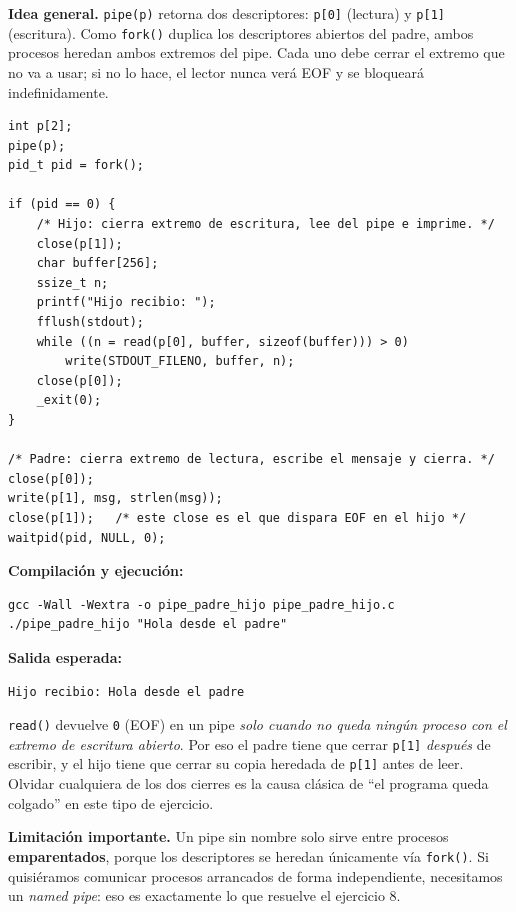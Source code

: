 \documentclass[11pt,a4paper]{article}
\begin{document}
\textbf{Idea general.} \texttt{pipe(p)} retorna dos descriptores:
\texttt{p[0]} (lectura) y \texttt{p[1]} (escritura). Como
\texttt{fork()} duplica los descriptores abiertos del padre, ambos
procesos heredan ambos extremos del pipe. Cada uno debe cerrar el
extremo que no va a usar; si no lo hace, el lector nunca verá EOF y
se bloqueará indefinidamente.

\begin{lstlisting}[style=cstyle]
int p[2];
pipe(p);
pid_t pid = fork();

if (pid == 0) {
    /* Hijo: cierra extremo de escritura, lee del pipe e imprime. */
    close(p[1]);
    char buffer[256];
    ssize_t n;
    printf("Hijo recibio: ");
    fflush(stdout);
    while ((n = read(p[0], buffer, sizeof(buffer))) > 0)
        write(STDOUT_FILENO, buffer, n);
    close(p[0]);
    _exit(0);
}

/* Padre: cierra extremo de lectura, escribe el mensaje y cierra. */
close(p[0]);
write(p[1], msg, strlen(msg));
close(p[1]);   /* este close es el que dispara EOF en el hijo */
waitpid(pid, NULL, 0);
\end{lstlisting}

\textbf{Compilación y ejecución:}

\begin{lstlisting}
gcc -Wall -Wextra -o pipe_padre_hijo pipe_padre_hijo.c
./pipe_padre_hijo "Hola desde el padre"
\end{lstlisting}

\textbf{Salida esperada:}

\begin{lstlisting}[style=outstyle]
Hijo recibio: Hola desde el padre
\end{lstlisting}

\begin{ojo}
\texttt{read()} devuelve \texttt{0} (EOF) en un pipe \emph{solo cuando
no queda ningún proceso con el extremo de escritura abierto}. Por eso
el padre tiene que cerrar \texttt{p[1]} \emph{después} de escribir, y
el hijo tiene que cerrar su copia heredada de \texttt{p[1]} antes de
leer. Olvidar cualquiera de los dos cierres es la causa clásica de
``el programa queda colgado'' en este tipo de ejercicio.
\end{ojo}

\textbf{Limitación importante.} Un pipe sin nombre solo sirve entre
procesos \textbf{emparentados}, porque los descriptores se heredan
únicamente vía \texttt{fork()}. Si quisiéramos comunicar procesos
arrancados de forma independiente, necesitamos un \emph{named pipe}:
eso es exactamente lo que resuelve el ejercicio 8.
\end{document}
